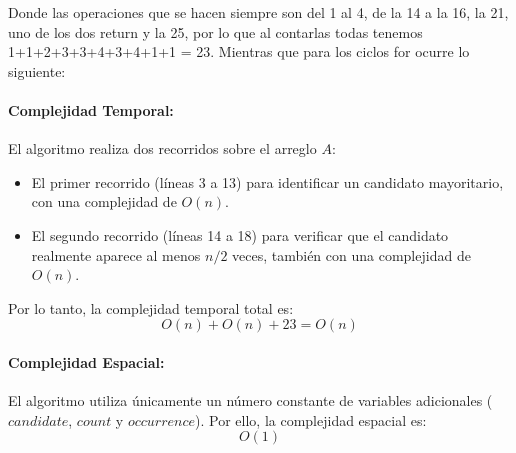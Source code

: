 Donde las operaciones que se hacen siempre son del 1 al 4, de la 14 a la 16, la 21, uno de los dos return y la 25, por lo que al contarlas todas tenemos 1+1+2+3+3+4+3+4+1+1 = 23.
Mientras que para los ciclos for ocurre lo siguiente:


\paragraph{Complejidad Temporal:}
El algoritmo realiza dos recorridos sobre el arreglo \( A \):
\begin{itemize}
    \item El primer recorrido (líneas 3 a 13) para identificar un candidato mayoritario, con una complejidad de \( O(n) \).
    \item El segundo recorrido (líneas 14 a 18) para verificar que el candidato realmente aparece al menos \( n/2 \) veces, también con una complejidad de \( O(n) \).
\end{itemize}
Por lo tanto, la complejidad temporal total es:
\[
O(n) + O(n) + 23 = O(n)
\]

\paragraph{Complejidad Espacial:}
El algoritmo utiliza únicamente un número constante de variables adicionales (\( candidate \), \( count \) y \( occurrence \)). Por ello, la complejidad espacial es:
\[
O(1)
\]
